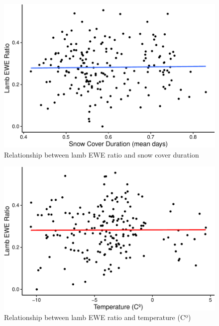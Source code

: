 \documentclass[
  12pt,
]{article}
\begin{document}
\begin{figure}
\centering
\includegraphics{FastFajardoPlasynski_ENV872_Project_files/figure-latex/unnamed-chunk-7-1.pdf}
\caption{Relationship between lamb EWE ratio and snow cover duration}
\end{figure}

\begin{figure}
\centering
\includegraphics{FastFajardoPlasynski_ENV872_Project_files/figure-latex/unnamed-chunk-8-1.pdf}
\caption{Relationship between lamb EWE ratio and temperature (Cº)}
\end{figure}
\end{document}
